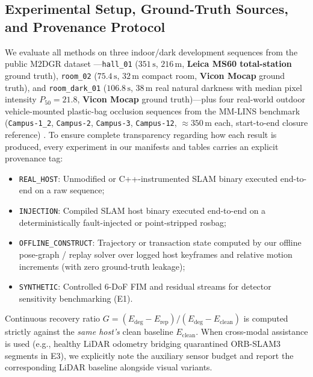 \documentclass[journal]{IEEEtran}
\begin{document}
\subsection{Experimental Setup, Ground-Truth Sources, and Provenance Protocol}
We evaluate all methods on three indoor/dark development sequences from the public M2DGR dataset \cite{yin2021m2dgr}---\texttt{hall\_01} ($351\,\mathrm{s}$, $216\,\mathrm{m}$, \textbf{Leica MS60 total-station} ground truth), \texttt{room\_02} ($75.4\,\mathrm{s}$, $32\,\mathrm{m}$ compact room, \textbf{Vicon Mocap} ground truth), and \texttt{room\_dark\_01} ($106.8\,\mathrm{s}$, $38\,\mathrm{m}$ real natural darkness with median pixel intensity $P_{50}=21.8$, \textbf{Vicon Mocap} ground truth)---plus four real-world outdoor vehicle-mounted plastic-bag occlusion sequences from the MM-LINS benchmark (\texttt{Campus-1\_2}, \texttt{Campus-2}, \texttt{Campus-3}, \texttt{Campus-12}, $\approx 350\,\mathrm{m}$ each, start-to-end closure reference) \cite{ma2025mmlins}. To ensure complete transparency regarding how each result is produced, every experiment in our manifests and tables carries an explicit provenance tag:
\begin{itemize}
    \item \texttt{REAL\_HOST}: Unmodified or C++-instrumented SLAM binary executed end-to-end on a raw sequence;
    \item \texttt{INJECTION}: Compiled SLAM host binary executed end-to-end on a deterministically fault-injected or point-stripped rosbag;
    \item \texttt{OFFLINE\_CONSTRUCT}: Trajectory or transaction state computed by our offline pose-graph / replay solver over logged host keyframes and relative motion increments (with zero ground-truth leakage);
    \item \texttt{SYNTHETIC}: Controlled 6-DoF FIM and residual streams for detector sensitivity benchmarking (E1).
\end{itemize}
Continuous recovery ratio $G = (E_{\mathrm{deg}} - E_{\mathrm{rep}}) / (E_{\mathrm{deg}} - E_{\mathrm{clean}})$ is computed strictly against the \emph{same host's} clean baseline $E_{\mathrm{clean}}$. When cross-modal assistance is used (e.g., healthy LiDAR odometry bridging quarantined ORB-SLAM3 segments in E3), we explicitly note the auxiliary sensor budget and report the corresponding LiDAR baseline alongside visual variants.
\end{document}
